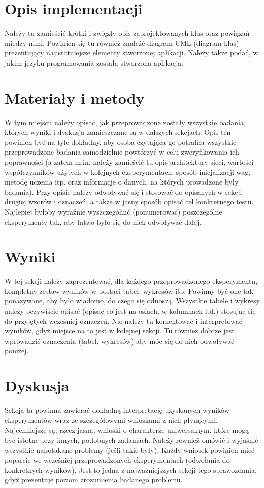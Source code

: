 \documentclass{classrep}
\begin{document}
\section{Opis implementacji}
{\color{blue}
Należy tu zamieścić krótki i zwięzły opis zaprojektowanych klas oraz powiązań
między nimi. Powinien się tu również znaleźć diagram UML  (diagram klas)
prezentujący najistotniejsze elementy stworzonej aplikacji. Należy także
podać, w jakim języku programowania została stworzona aplikacja. }

\section{Materiały i metody}
{\color{blue}
W tym miejscu należy opisać, jak przeprowadzone zostały wszystkie badania,
których wyniki i dyskusja zamieszczane są w dalszych sekcjach. Opis ten
powinien być na tyle dokładny, aby osoba czytająca go potrafiła wszystkie
przeprowadzone badania samodzielnie powtórzyć w celu zweryfikowania ich
poprawności (a zatem m.in. należy zamieścić tu opis architektury sieci,
wartości współczynników użytych w kolejnych eksperymentach, sposób
inicjalizacji wag, metodę uczenia itp. oraz informacje o danych, na których
prowadzone były badania). Przy opisie należy odwoływać się i stosować do
opisanych w sekcji drugiej wzorów i oznaczeń, a także w jasny sposób opisać
cel konkretnego testu. Najlepiej byłoby wyraźnie wyszczególnić (ponumerować)
poszczególne eksperymenty tak, aby łatwo było się do nich odwoływać dalej.}

\section{Wyniki}
{\color{blue}
W tej sekcji należy zaprezentować, dla każdego przeprowadzonego eksperymentu,
kompletny zestaw wyników w postaci tabel, wykresów itp. Powinny być one tak
ponazywane, aby było wiadomo, do czego się odnoszą. Wszystkie tabele i wykresy
należy oczywiście opisać (opisać co jest na osiach, w kolumnach itd.) stosując
się do przyjętych wcześniej oznaczeń. Nie należy tu komentować i interpretować
wyników, gdyż miejsce na to jest w kolejnej sekcji. Tu również dobrze jest
wprowadzić oznaczenia (tabel, wykresów) aby móc się do nich odwoływać
poniżej.}

\section{Dyskusja}
{\color{blue}
Sekcja ta powinna zawierać dokładną interpretację uzyskanych wyników
eksperymentów wraz ze szczegółowymi wnioskami z nich płynącymi. Najcenniejsze
są, rzecz jasna, wnioski o charakterze uniwersalnym, które mogą być istotne
przy innych, podobnych zadaniach. Należy również omówić i wyjaśnić wszystkie
napotakane problemy (jeśli takie były). Każdy wniosek powinien mieć poparcie
we wcześniej przeprowadzonych eksperymentach (odwołania do konkretnych
wyników). Jest to jedna z najważniejszych sekcji tego sprawozdania, gdyż
prezentuje poziom zrozumienia badanego problemu.}
\end{document}
